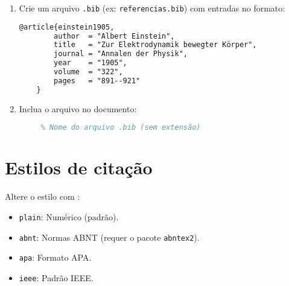 \begin{enumerate}
    \item Crie um arquivo \verb|.bib| (ex: \verb|referencias.bib|) com entradas no formato:
    \begin{lstlisting}[language=tex, caption=Exemplo de formatação em um arquivo \texttt{.bib}]
    @article{einstein1905,
        author  = "Albert Einstein",
        title   = "Zur Elektrodynamik bewegter Körper",
        journal = "Annalen der Physik",
        year    = "1905",
        volume  = "322",
        pages   = "891--921"
    }
    \end{lstlisting}

    \item Inclua o arquivo no documento:
    \begin{lstlisting}[language=tex, caption=Incluindo o arquivo de bibliografias no documento]
     % Estilo (ex: abnt, ieee, apa)
     % Nome do arquivo .bib (sem extensão)
    \end{lstlisting}
\end{enumerate}

\section{Estilos de citação}

Altere o estilo com \verb||:

\begin{itemize}
    \item \verb|plain|: Numérico (padrão).
    \item \verb|abnt|: Normas ABNT (requer o pacote \verb|abntex2|).
    \item \verb|apa|: Formato APA.
    \item \verb|ieee|: Padrão IEEE.
\end{itemize}

\begin{lstlisting}[language=tex, caption=Definindo o estilo da bibliografia]
      
      
\end{lstlisting}

